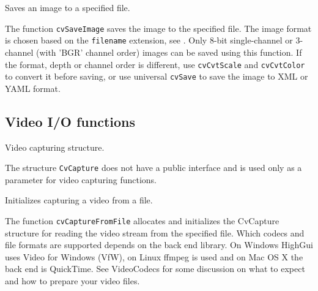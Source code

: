 
Saves an image to a specified file.


\begin{description}
\end{description}

The function \texttt{cvSaveImage} saves the image to the specified file. The image format is chosen based on the \texttt{filename} extension, see . Only 8-bit single-channel or 3-channel (with 'BGR' channel order) images can be saved using this function. If the format, depth or channel order is different, use \texttt{cvCvtScale} and \texttt{cvCvtColor} to convert it before saving, or use universal \texttt{cvSave} to save the image to XML or YAML format.

\subsection{Video I/O functions}


Video capturing structure.


The structure \texttt{CvCapture} does not have a public interface and is used only as a parameter for video capturing functions.


Initializes capturing a video from a file.


\begin{description}
\end{description}

The function \texttt{cvCaptureFromFile} allocates and initializes the CvCapture structure for reading the video stream from the specified file. Which codecs and file formats are supported depends on the back end library. On Windows HighGui uses Video for Windows (VfW), on Linux ffmpeg is used and on Mac OS X the back end is QuickTime. See VideoCodecs for some discussion on what to expect and how to prepare your video files.

